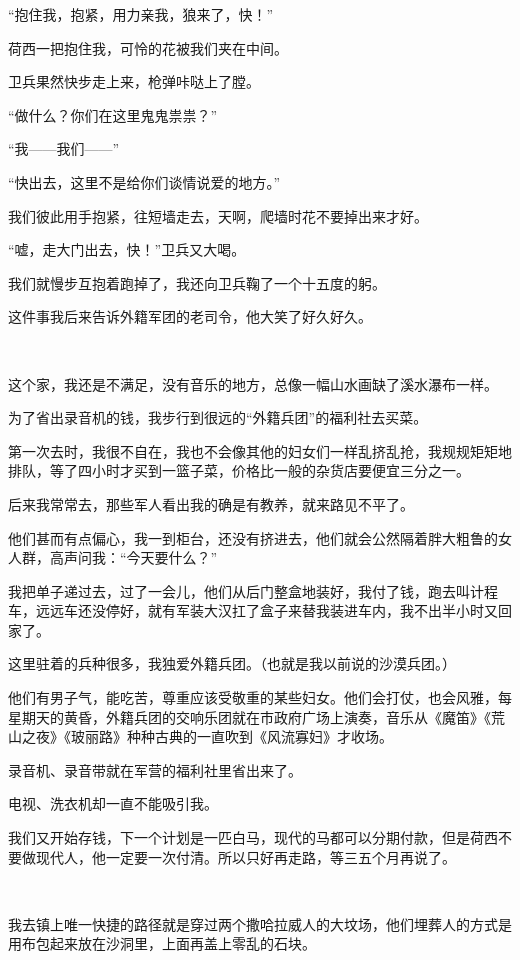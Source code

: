 \par “抱住我，抱紧，用力亲我，狼来了，快！”
\par 荷西一把抱住我，可怜的花被我们夹在中间。
\par 卫兵果然快步走上来，枪弹咔哒上了膛。
\par “做什么？你们在这里鬼鬼祟祟？”
\par “我——我们——”
\par “快出去，这里不是给你们谈情说爱的地方。”
\par 我们彼此用手抱紧，往短墙走去，天啊，爬墙时花不要掉出来才好。
\par “嘘，走大门出去，快！”卫兵又大喝。
\par 我们就慢步互抱着跑掉了，我还向卫兵鞠了一个十五度的躬。
\par 这件事我后来告诉外籍军团的老司令，他大笑了好久好久。
\par  
\par 这个家，我还是不满足，没有音乐的地方，总像一幅山水画缺了溪水瀑布一样。
\par 为了省出录音机的钱，我步行到很远的“外籍兵团”的福利社去买菜。
\par 第一次去时，我很不自在，我也不会像其他的妇女们一样乱挤乱抢，我规规矩矩地排队，等了四小时才买到一篮子菜，价格比一般的杂货店要便宜三分之一。
\par 后来我常常去，那些军人看出我的确是有教养，就来路见不平了。
\par 他们甚而有点偏心，我一到柜台，还没有挤进去，他们就会公然隔着胖大粗鲁的女人群，高声问我：“今天要什么？”
\par 我把单子递过去，过了一会儿，他们从后门整盒地装好，我付了钱，跑去叫计程车，远远车还没停好，就有军装大汉扛了盒子来替我装进车内，我不出半小时又回家了。
\par 这里驻着的兵种很多，我独爱外籍兵团。（也就是我以前说的沙漠兵团。）
\par 他们有男子气，能吃苦，尊重应该受敬重的某些妇女。他们会打仗，也会风雅，每星期天的黄昏，外籍兵团的交响乐团就在市政府广场上演奏，音乐从《魔笛》《荒山之夜》《玻丽路》种种古典的一直吹到《风流寡妇》才收场。
\par 录音机、录音带就在军营的福利社里省出来了。
\par 电视、洗衣机却一直不能吸引我。
\par 我们又开始存钱，下一个计划是一匹白马，现代的马都可以分期付款，但是荷西不要做现代人，他一定要一次付清。所以只好再走路，等三五个月再说了。
\par  
\par 我去镇上唯一快捷的路径就是穿过两个撒哈拉威人的大坟场，他们埋葬人的方式是用布包起来放在沙洞里，上面再盖上零乱的石块。
